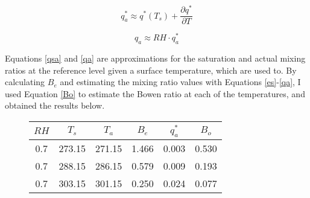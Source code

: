 \documentclass[12pt]{article}
\begin{document}
\begin{equation}\label{qsa}
    q^*_a \approx q^*(T_s) + \frac{\partial q^*}{\partial T}
\end{equation}

\begin{equation}\label{qa}
    q_a \approx RH \cdot q^*_a
\end{equation}

Equations \ref{qsa} and \ref{qa} are approximations for the saturation and actual mixing ratios at the reference level given a surface temperature, which are used to. By calculating $B_e$ and estimating the mixing ratio values with Equations \ref{es}-\ref{qa}, I used Equation \ref{Bo} to estimate the Bowen ratio at each of the temperatures, and obtained the results below.

\begin{figure}[h!]\label{q2}
    \centering
    \begin{tabular}{ c c c | c c c}
        $RH$ & $T_s$ & $T_a$ & $B_e$ & $q^*_a$ & $B_o$ \\
        \hline
        0.7 & 273.15 & 271.15 & 1.466 & 0.003 & 0.530 \\
        0.7 & 288.15 & 286.15 & 0.579 & 0.009 & 0.193 \\
        0.7 & 303.15 & 301.15 & 0.250 & 0.024 & 0.077 \\
    \end{tabular}
\end{figure}
\end{document}
